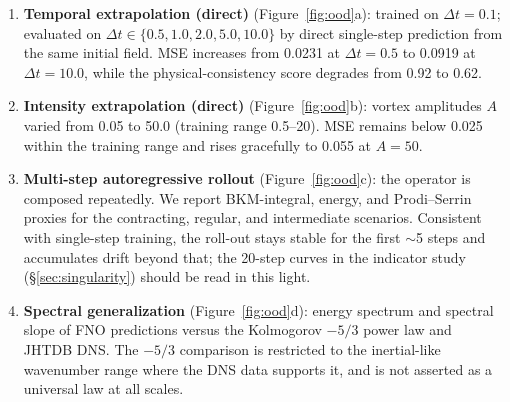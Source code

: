 \documentclass[review]{elsarticle}
\begin{document}
\begin{enumerate}
    \item \textbf{Temporal extrapolation (direct)} (Figure~\ref{fig:ood}a): trained on $\Delta t=0.1$; evaluated on $\Delta t \in \{0.5, 1.0, 2.0, 5.0, 10.0\}$ by direct single-step prediction from the same initial field. MSE increases from 0.0231 at $\Delta t=0.5$ to 0.0919 at $\Delta t=10.0$, while the physical-consistency score degrades from 0.92 to 0.62.
    \item \textbf{Intensity extrapolation (direct)} (Figure~\ref{fig:ood}b): vortex amplitudes $A$ varied from 0.05 to 50.0 (training range 0.5--20). MSE remains below 0.025 within the training range and rises gracefully to 0.055 at $A=50$.
    \item \textbf{Multi-step autoregressive rollout} (Figure~\ref{fig:ood}c): the operator is composed repeatedly. We report BKM-integral, energy, and Prodi--Serrin proxies for the contracting, regular, and intermediate scenarios. Consistent with single-step training, the roll-out stays stable for the first $\sim$5 steps and accumulates drift beyond that; the 20-step curves in the indicator study (\S\ref{sec:singularity}) should be read in this light.
    \item \textbf{Spectral generalization} (Figure~\ref{fig:ood}d): energy spectrum and spectral slope of FNO predictions versus the Kolmogorov $-5/3$ power law and JHTDB DNS. The $-5/3$ comparison is restricted to the inertial-like wavenumber range where the DNS data supports it, and is not asserted as a universal law at all scales.
\end{enumerate}
\end{document}
